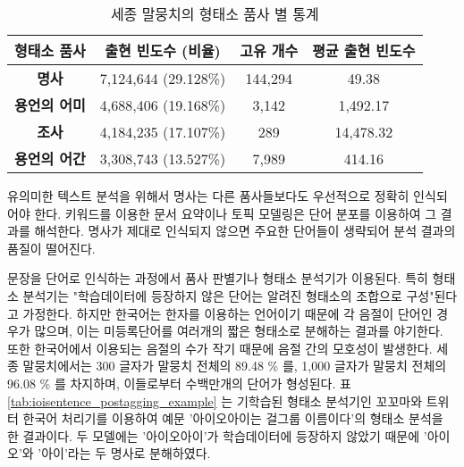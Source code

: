 \documentclass[oneside, ko,phd]{snuthesis_utf8_kor}
\begin{document}
\begin{table}[ht]
  \centering
  \caption{세종 말뭉치의 형태소 품사 별 통계}
  \label{tab:pos_statistics}
\begin{tabular}{|>{}c |c|c|c|}
\hline
\textbf{형태소 품사}  & \textbf{출현 빈도수 (비율)} & \textbf{고유 개수} & \textbf{평균 출현 빈도수} \\ \hline
\textbf{명사} & 7,124,644 (29.128\%) & 144,294 & 49.38 \\ \hline
\textbf{용언의 어미} & 4,688,406 (19.168\%) & 3,142 & 1,492.17  \\ \hline
\textbf{조사} & 4,184,235 (17.107\%) & 289  & 14,478.32 \\ \hline
\textbf{용언의 어간} & 3,308,743 (13.527\%) & 7,989 & 414.16  \\ \hline
\end{tabular}
\end{table}

유의미한 텍스트 분석을 위해서 명사는 다른 품사들보다도 우선적으로 정확히 인식되어야 한다.
키워드를 이용한 문서 요약이나 토픽 모델링은 단어 분포를 이용하여 그 결과를 해석한다.
명사가 제대로 인식되지 않으면 주요한 단어들이 생략되어 분석 결과의 품질이 떨어진다.

문장을 단어로 인식하는 과정에서 품사 판별기나 형태소 분석기가 이용된다.
특히 형태소 분석기는 "학습데이터에 등장하지 않은 단어는 알려진 형태소의 조합으로 구성"된다고 가정한다.
하지만 한국어는 한자를 이용하는 언어이기 때문에 각 음절이 단어인 경우가 많으며, 이는 미등록단어를 여러개의 짧은 형태소로 분해하는 결과를 야기한다.
또한 한국어에서 이용되는 음절의 수가 작기 때문에 음절 간의 모호성이 발생한다.
세종 말뭉치에서는 300 글자가 말뭉치 전체의 89.48 \% 를, 1,000 글자가 말뭉치 전체의 96.08 \% 를 차지하며, 이들로부터 수백만개의 단어가 형성된다.
표 \ref{tab:ioisentence_postagging_example} 는 기학습된 형태소 분석기인 꼬꼬마와 트위터 한국어 처리기를 이용하여 예문 '아이오아이는 걸그룹 이름이다'의 형태소 분석을 한 결과이다.
두 모델에는 '아이오아이'가 학습데이터에 등장하지 않았기 때문에 '아이오'와 '아이'라는 두 명사로 분해하였다.

\begin{table}[ht]
\centering
\caption{기학습된 한국어 형태소 분석기를 이용한 문장 분석 예시. (N: 명사, J: 조사, V: 동사, E: 어미, VCP: 동사형 전성어미)}
\label{tab:ioisentence_postagging_example}
\end{table}
\end{document}
